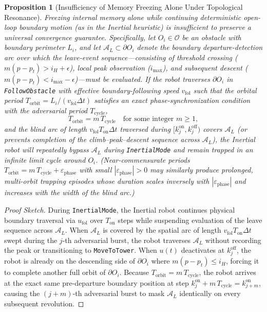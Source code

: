 \documentclass[12pt, a4paper]{article}
\newtheorem{proposition}{Proposition}
\begin{document}
\begin{proposition}[Insufficiency of Memory Freezing Alone Under Topological Resonance]
\label{prop:inertial_resonance}
Freezing internal memory alone while continuing deterministic open-loop boundary motion (as in the Inertial heuristic) is insufficient to preserve a universal convergence guarantee. Specifically, let $O_i \in \mathcal{O}$ be an obstacle with boundary perimeter $L_i$, and let $\mathcal{A}_L \subset \partial O_i$ denote the boundary departure-detection arc over which the leave-event sequence—consisting of threshold crossing ($m(p - p_t) > i_H + \epsilon$), local peak observation ($i_{\max}$), and subsequent descent ($m(p - p_t) < i_{\max} - \epsilon$)—must be evaluated. If the robot traverses $\partial O_i$ in \texttt{FollowObstacle} with effective boundary-following speed $v_{\text{fol}}$ such that the orbital period $T_{\text{orbit}} = L_i / (v_{\text{fol}}\Delta t)$ satisfies an exact phase-synchronization condition with the adversarial period $T_{\text{cycle}}$,
\begin{equation}
    T_{\text{orbit}} = m \, T_{\text{cycle}} \quad \text{for some integer } m \ge 1,
    \label{eq:resonance_cond}
\end{equation}
and the blind arc of length $v_{\text{fol}} T_{\text{on}} \Delta t$ traversed during $[k_j^{\text{on}}, k_j^{\text{off}})$ covers $\mathcal{A}_L$ (or prevents completion of the climb--peak--descent sequence across $\mathcal{A}_L$), the Inertial robot will repeatedly bypass $\mathcal{A}_L$ during \texttt{InertialMode} and remain trapped in an infinite limit cycle around $O_i$. (Near-commensurate periods $T_{\text{orbit}} = m\,T_{\text{cycle}} + \varepsilon_{\text{phase}}$ with small $|\varepsilon_{\text{phase}}| > 0$ may similarly produce prolonged, multi-orbit trapping episodes whose duration scales inversely with $|\varepsilon_{\text{phase}}|$ and increases with the width of the blind arc.)
\end{proposition}

\begin{proof}[Proof Sketch]
During \texttt{InertialMode}, the Inertial robot continues physical boundary traversal via $u_{\text{fol}}$ over $T_{\text{on}}$ steps while suspending evaluation of the leave sequence across $\mathcal{A}_L$. When $\mathcal{A}_L$ is covered by the spatial arc of length $v_{\text{fol}} T_{\text{on}} \Delta t$ swept during the $j$-th adversarial burst, the robot traverses $\mathcal{A}_L$ without recording the peak or transitioning to \texttt{MoveToTower}. When $u(t)$ deactivates at $k_j^{\text{off}}$, the robot is already on the descending side of $\partial O_i$ where $m(p - p_t) \le i_H$, forcing it to complete another full orbit of $\partial O_i$. Because $T_{\text{orbit}} = m \, T_{\text{cycle}}$, the robot arrives at the exact same pre-departure boundary position at step $k_j^{\text{on}} + m\,T_{\text{cycle}} = k_{j+m}^{\text{on}}$, causing the $(j+m)$-th adversarial burst to mask $\mathcal{A}_L$ identically on every subsequent revolution.
\end{proof}
\end{document}
